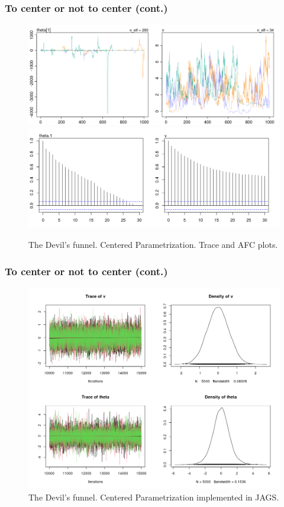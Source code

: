 \documentclass[nonav,sleutel]{beamer}
\begin{document}
	\begin{frame}
		\frametitle{To center or not to center (cont.)}
		\begin{figure}[h] 
			\centering
			\includegraphics[width=.70\linewidth]{1_trace_CE_simple}
			\includegraphics[width=.73\linewidth]{1_acf_CE_simple}
			\caption{The Devil's funnel. Centered Parametrization. Trace and AFC plots.}
			\label{fig:devil_CE}
		\end{figure}
	\end{frame}
	\begin{frame}
		\frametitle{To center or not to center (cont.)}
		\begin{figure}[H]
			\centering
			\includegraphics[width=0.7\linewidth]{1_jags_CE_simple}
			\caption{The Devil's funnel. Centered Parametrization implemented in JAGS.}
			\label{fig:devil_CE_simple_jags}
		\end{figure}
	\end{frame}
\end{document}
